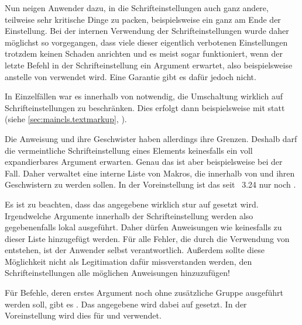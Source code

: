 Nun neigen Anwender dazu, in die Schrifteinstellungen auch ganz andere,
teilweise sehr kritische Dinge zu packen, beispielsweise ein
 ganz am Ende der Einstellung. Bei der internen
Verwendung der Schrifteinstellungen wurde daher möglichst so vorgegangen, dass
viele dieser eigentlich verbotenen Einstellungen trotzdem keinen Schaden
anrichten und es meist sogar funktioniert, wenn der letzte Befehl in der
Schrifteinstellung ein Argument erwartet, also beispielsweise 
anstelle von  verwendet wird. Eine Garantie gibt es dafür
jedoch nicht. 

In Einzelfällen war es innerhalb von \KOMAScript{} notwendig, die Umschaltung
wirklich auf Schrifteinstellungen zu beschränken. Dies erfolgt dann
beispielsweise mit
%
%
%
 statt  (siehe
\autoref{sec:maincls.textmarkup},
).

Die Anweisung  und ihre Geschwister
haben allerdings ihre Grenzen. Deshalb darf die vermeintliche Schrifteinstellung
eines Elements keinesfalls ein voll expandierbares Argument erwarten. Genau
das ist aber beispielsweise bei  der
Fall. Daher verwaltet \KOMAScript{} eine interne Liste von Makros, die
innerhalb von  und ihren Geschwistern
zu  werden sollen. In der Voreinstellung ist das seit
\KOMAScript~3.24 nur noch .

Es ist zu beachten, dass das angegebene  wirklich stur auf
 gesetzt wird. Irgendwelche Argumente innerhalb der
Schrifteinstellung werden also gegebenenfalls lokal ausgeführt. Daher dürfen
Anweisungen wie  keinesfalls zu dieser Liste hinzugefügt
werden. Für alle Fehler, die durch die Verwendung von
 entstehen, ist der Anwender selbst
verantwortlich. Außerdem sollte diese Möglichkeit nicht als Legitimation dafür
missverstanden werden, den Schrifteinstellungen alle möglichen Anweisungen
hinzuzufügen!

Für Befehle, deren erstes Argument noch ohne zusätzliche
Gruppe ausgeführt werden soll, gibt es
. Das angegebene  wird dabei auf
 gesetzt. In der Voreinstellung wird dies für
 und  verwendet.


